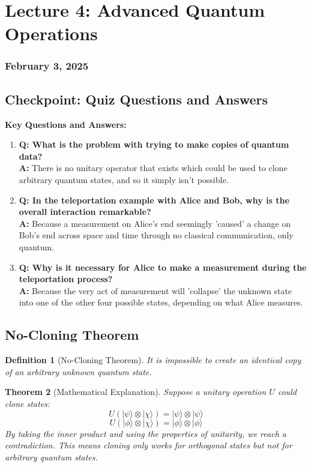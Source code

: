 \documentclass{article}
\newtheorem{theorem}{Theorem}[subsection]
\newtheorem{definition}[theorem]{Definition}
\begin{document}
\newpage
\section{Lecture 4: Advanced Quantum Operations}
\subsubsection*{February 3, 2025}

\subsection{Checkpoint: Quiz Questions and Answers}
\begin{conceptbox}
\textbf{Key Questions and Answers:}
\begin{enumerate}
    \item \textbf{Q: What is the problem with trying to make copies of quantum data?} \\
    \textbf{A:} There is no unitary operator that exists which could be used to clone arbitrary quantum states, and so it simply isn't possible.
    
    \item \textbf{Q: In the teleportation example with Alice and Bob, why is the overall interaction remarkable?} \\
    \textbf{A:} Because a measurement on Alice's end seemingly 'caused' a change on Bob's end across space and time through no classical communication, only quantum.
    
    \item \textbf{Q: Why is it necessary for Alice to make a measurement during the teleportation process?} \\
    \textbf{A:} Because the very act of measurement will 'collapse' the unknown state into one of the other four possible states, depending on what Alice measures.
\end{enumerate}
\end{conceptbox}

\subsection{No-Cloning Theorem}
\begin{definition}[No-Cloning Theorem]
It is impossible to create an identical copy of an arbitrary unknown quantum state.
\end{definition}

\begin{theorem}[Mathematical Explanation]
Suppose a unitary operation \(U\) could clone states:
\[
U(|\psi\rangle \otimes |\chi\rangle) = |\psi\rangle \otimes |\psi\rangle
\]
\[
U(|\phi\rangle \otimes |\chi\rangle) = |\phi\rangle \otimes |\phi\rangle
\]
By taking the inner product and using the properties of unitarity, we reach a contradiction. This means cloning only works for orthogonal states but not for arbitrary quantum states.
\end{theorem}
\end{document}
